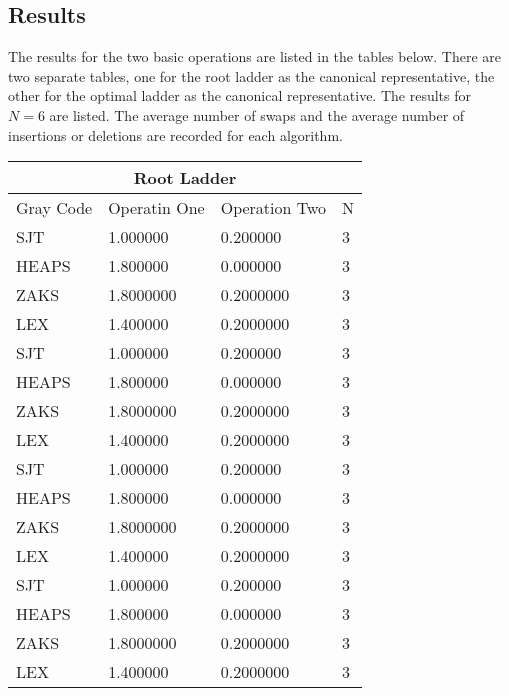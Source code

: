 \subsection{Results}

The results for the two basic operations are listed in the tables below. There are two separate tables, one 
for the root ladder as the canonical representative, the other for the optimal ladder as the canonical representative.
The results for $N=6$ are listed. The average number of swaps and the average number of insertions or deletions are 
recorded for each algorithm.

\begin{tabular}{ |p{3cm}||p{3cm}|p{3cm}|p{3cm}}
 \hline
 \multicolumn{4}{|c|}{Root Ladder} \\
 \hline
 Gray Code& Operatin One &Operation Two& N\\
 \hline
 SJT  & 1.000000 &0.200000 & 3\\
 HEAPS & 1.800000 & 0.000000 & 3 \\
 ZAKS & 1.8000000 & 0.2000000 &  3\\
 LEX & 1.400000 & 0.2000000 &  3\\

 SJT  & 1.000000 &0.200000 & 3\\
 HEAPS & 1.800000 & 0.000000 & 3 \\
 ZAKS & 1.8000000 & 0.2000000 &  3\\
 LEX & 1.400000 & 0.2000000 &  3\\
 
 SJT  & 1.000000 &0.200000 & 3\\
 HEAPS & 1.800000 & 0.000000 & 3 \\
 ZAKS & 1.8000000 & 0.2000000 &  3\\
 LEX & 1.400000 & 0.2000000 &  3\\
 
 SJT  & 1.000000 &0.200000 & 3\\
 HEAPS & 1.800000 & 0.000000 & 3 \\
 ZAKS & 1.8000000 & 0.2000000 &  3\\
 LEX & 1.400000 & 0.2000000 &  3\\
 \hline
\end{tabular}
